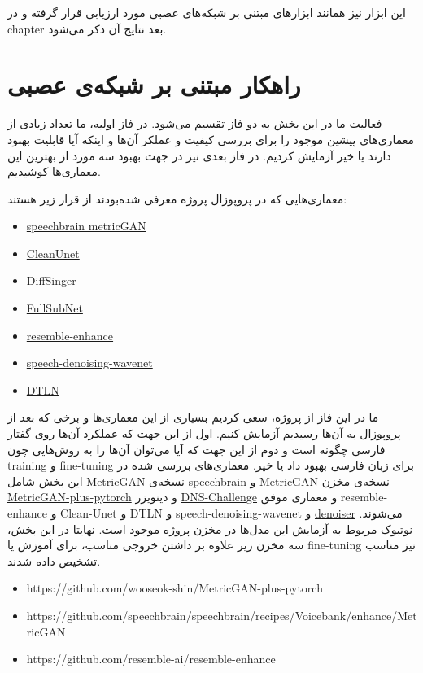 \documentclass[fleqn]{report}
\begin{document}
این ابزار نیز همانند ابزار‌های مبتنی بر شبکه‌های عصبی مورد ارزیابی قرار گرفته و در chapter بعد نتایج آن ذکر می‌شود.

\section{راهکار مبتنی بر شبکه‌ی عصبی}
فعالیت ما در این بخش به دو فاز تقسیم می‌شود.
در فاز اولیه، ما تعداد زیادی از معماری‌های پیشین موجود را برای بررسی کیفیت و عملکر آن‌ها و اینکه آیا قابلیت بهبود دارند یا خیر آزمایش کردیم.
در فاز بعدی نیز در جهت بهبود سه مورد از بهترین این معماری‌ها کوشیدیم.

معماری‌هایی که در پروپوزال پروژه معرفی شده‌بودند از قرار زیر هستند:

\begin{itemize}
    \item \href{https://github.com/speechbrain/speechbrain/tree/develop/recipes/Voicebank/enhance/MetricGAN}{speechbrain metricGAN}
    \item \href{https://github.com/nvidia/cleanunet}{CleanUnet}
    \item \href{https://github.com/keonlee9420/DiffSinger}{DiffSinger}
    \item \href{https://github.com/haoxiangsnr/FullSubNet}{FullSubNet}
    \item \href{https://github.com/resemble-ai/resemble-enhance}{resemble-enhance}
    \item \href{https://github.com/drethage/speech-denoising-wavenet}{speech-denoising-wavenet}
    \item \href{https://github.com/breizhn/DTLN}{DTLN}
\end{itemize}

ما در این فاز از پروژه، سعی کردیم بسیاری از این معماری‌ها و برخی که بعد از پروپوزال به آن‌ها رسیدیم آزمایش کنیم.
اول از این جهت که عملکرد آن‌ها روی گفتار فارسی چگونه است و دوم از این جهت که آیا می‌توان آن‌ها را به روش‌هایی چون training و fine-tuning برای زبان فارسی بهبود داد یا خیر.
معماری‌های بررسی شده در این بخش شامل 
MetricGAN نسخه‌ی speechbrain و MetricGAN نسخه‌ی مخزن \href{https://github.com/wooseok-shin/MetricGAN-plus-pytorch}{MetricGAN-plus-pytorch}
و 
دینویزر \href{https://github.com/microsoft/DNS-Challenge}{DNS-Challenge}
و 
معماری موفق resemble-enhance
و 
Clean-Unet
 و DTLN
 و 
 speech-denoising-wavenet
 و
 \href{https://github.com/facebookresearch/denoiser}{denoiser} 
 می‌شوند.
 نوتبوک مربوط به آزمایش این مدل‌ها در مخزن پروژه موجود است.
نهایتا در این بخش، سه مخزن 
زیر علاوه بر داشتن خروجی مناسب، برای آموزش یا fine-tuning نیز مناسب تشخیص داده شدند.

\begin{itemize}
    \item https://github.com/wooseok-shin/MetricGAN-plus-pytorch
    \item https://github.com/speechbrain/speechbrain/recipes/Voicebank/enhance/MetricGAN
    \item https://github.com/resemble-ai/resemble-enhance
\end{itemize}
\end{document}
